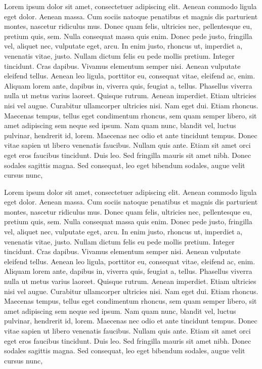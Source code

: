 \documentclass[a4paper,11pt,spanish, twoside, leqno]{tfg-uam}
\theoremstyle{definition}
\begin{document}
Lorem ipsum dolor sit amet, consectetuer adipiscing elit. Aenean commodo ligula eget dolor. Aenean massa. Cum sociis natoque penatibus et magnis dis parturient montes, nascetur ridiculus mus. Donec quam felis, ultricies nec, pellentesque eu, pretium quis, sem. Nulla consequat massa quis enim. Donec pede justo, fringilla vel, aliquet nec, vulputate eget, arcu. In enim justo, rhoncus ut, imperdiet a, venenatis vitae, justo. Nullam dictum felis eu pede mollis pretium. Integer tincidunt. Cras dapibus. Vivamus elementum semper nisi. Aenean vulputate eleifend tellus. Aenean leo ligula, porttitor eu, consequat vitae, eleifend ac, enim. Aliquam lorem ante, dapibus in, viverra quis, feugiat a, tellus. Phasellus viverra nulla ut metus varius laoreet. Quisque rutrum. Aenean imperdiet. Etiam ultricies nisi vel augue. Curabitur ullamcorper ultricies nisi. Nam eget dui. Etiam rhoncus. Maecenas tempus, tellus eget condimentum rhoncus, sem quam semper libero, sit amet adipiscing sem neque sed ipsum. Nam quam nunc, blandit vel, luctus pulvinar, hendrerit id, lorem. Maecenas nec odio et ante tincidunt tempus. Donec vitae sapien ut libero venenatis faucibus. Nullam quis ante. Etiam sit amet orci eget eros faucibus tincidunt. Duis leo. Sed fringilla mauris sit amet nibh. Donec sodales sagittis magna. Sed consequat, leo eget bibendum sodales, augue velit cursus nunc,


Lorem ipsum dolor sit amet, consectetuer adipiscing elit. Aenean commodo ligula eget dolor. Aenean massa. Cum sociis natoque penatibus et magnis dis parturient montes, nascetur ridiculus mus. Donec quam felis, ultricies nec, pellentesque eu, pretium quis, sem. Nulla consequat massa quis enim. Donec pede justo, fringilla vel, aliquet nec, vulputate eget, arcu. In enim justo, rhoncus ut, imperdiet a, venenatis vitae, justo. Nullam dictum felis eu pede mollis pretium. Integer tincidunt. Cras dapibus. Vivamus elementum semper nisi. Aenean vulputate eleifend tellus. Aenean leo ligula, porttitor eu, consequat vitae, eleifend ac, enim. Aliquam lorem ante, dapibus in, viverra quis, feugiat a, tellus. Phasellus viverra nulla ut metus varius laoreet. Quisque rutrum. Aenean imperdiet. Etiam ultricies nisi vel augue. Curabitur ullamcorper ultricies nisi. Nam eget dui. Etiam rhoncus. Maecenas tempus, tellus eget condimentum rhoncus, sem quam semper libero, sit amet adipiscing sem neque sed ipsum. Nam quam nunc, blandit vel, luctus pulvinar, hendrerit id, lorem. Maecenas nec odio et ante tincidunt tempus. Donec vitae sapien ut libero venenatis faucibus. Nullam quis ante. Etiam sit amet orci eget eros faucibus tincidunt. Duis leo. Sed fringilla mauris sit amet nibh. Donec sodales sagittis magna. Sed consequat, leo eget bibendum sodales, augue velit cursus nunc,
\end{document}
